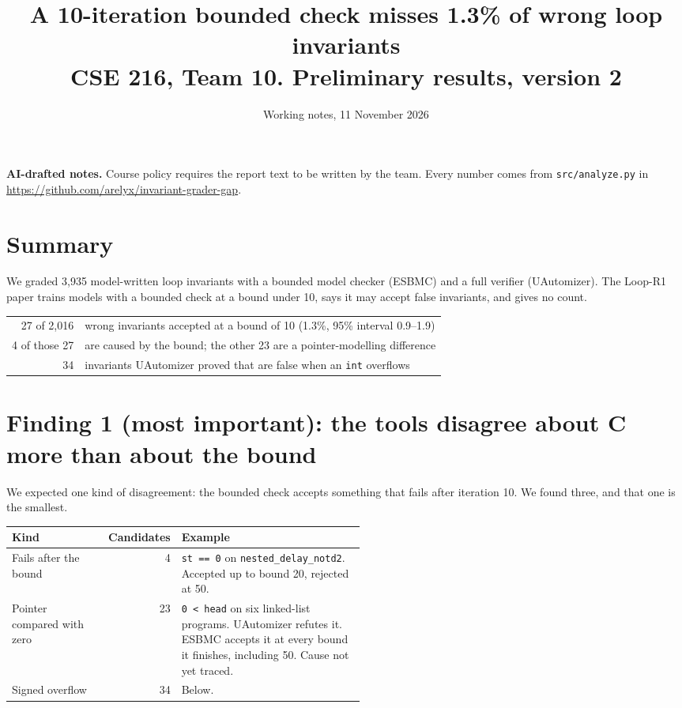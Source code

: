\documentclass[11pt]{article}
\title{A 10-iteration bounded check misses 1.3\% of wrong loop invariants\\
\large CSE 216, Team 10. Preliminary results, version 2}
\author{Working notes, 11 November 2026}
\date{}
\newcommand{\code}[1]{\texttt{#1}}
\begin{document}
\maketitle

\noindent\textbf{AI-drafted notes.} Course policy requires the report text to be written by the
team. Every number comes from \code{src/analyze.py} in
\url{https://github.com/arelyx/invariant-grader-gap}.

\section*{Summary}

We graded 3{,}935 model-written loop invariants with a bounded model checker (ESBMC) and a full
verifier (UAutomizer). The Loop-R1 paper trains models with a bounded check at a bound under 10,
says it may accept false invariants, and gives no count.

\begin{center}
\begin{tabular}{rl}
\toprule
27 of 2{,}016 & wrong invariants accepted at a bound of 10 (1.3\%, 95\% interval 0.9--1.9) \\
4 of those 27 & are caused by the bound; the other 23 are a pointer-modelling difference \\
34 & invariants UAutomizer proved that are false when an \code{int} overflows \\
\bottomrule
\end{tabular}
\end{center}

\section{Finding 1 (most important): the tools disagree about C more than about the bound}

We expected one kind of disagreement: the bounded check accepts something that fails after
iteration 10. We found three, and that one is the smallest.

\begin{center}
\begin{tabular}{lrp{0.52\linewidth}}
\toprule
Kind & Candidates & Example \\
\midrule
Fails after the bound & 4 & \code{st == 0} on \code{nested\_delay\_notd2}. Accepted up to bound
20, rejected at 50. \\
Pointer compared with zero & 23 & \code{0 < head} on six linked-list programs. UAutomizer refutes
it. ESBMC accepts it at every bound it finishes, including 50. Cause not yet traced. \\
Signed overflow & 34 & Below. \\
\bottomrule
\end{tabular}
\end{center}
\end{document}
